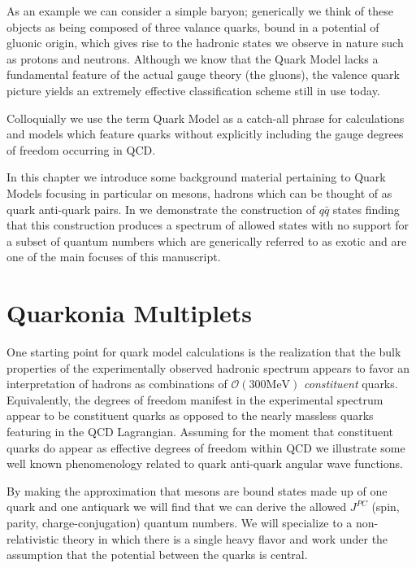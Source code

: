  As an example we can consider a simple baryon; generically we think of these objects as being composed of three valance quarks, bound in a potential of gluonic origin, which gives rise to the hadronic states we observe in nature such as protons and neutrons. Although we know that the Quark Model lacks a fundamental feature of the actual gauge theory (the gluons), the valence quark picture yields an extremely effective classification scheme still in use today.

Colloquially we use the term Quark Model as a catch-all phrase for calculations and models which feature quarks without explicitly including the gauge degrees of freedom occurring in QCD. 

In this chapter we introduce some background material pertaining to Quark Models focusing in particular on mesons, hadrons which can be thought of as quark anti-quark pairs. In  we demonstrate the construction of $q\bar{q}$ states finding that this construction produces a spectrum of allowed states with no support for a subset of quantum numbers which are generically referred to as exotic and are one of the main focuses of this manuscript. 



\section{Quarkonia Multiplets} \label{QM::CQM}

One starting point for quark model calculations is the realization that the bulk properties of the experimentally observed hadronic spectrum appears to favor an interpretation of hadrons as combinations of $\mathcal{O}(300\mathrm{MeV})$ \emph{constituent} quarks. Equivalently, the degrees of freedom manifest in the experimental spectrum appear to be constituent quarks as opposed to the nearly massless quarks featuring in the QCD Lagrangian. Assuming for the moment that constituent quarks do appear as effective degrees of freedom within QCD we illustrate some well known phenomenology related to quark anti-quark angular wave functions. 

By making the approximation that mesons are bound states made up of one quark and one antiquark  we will find that we can derive the allowed $J^{PC}$ (spin, parity, charge-conjugation) quantum numbers. We will specialize to a non-relativistic theory in which there is a single heavy flavor and work under the assumption that the potential between the quarks is central. 

